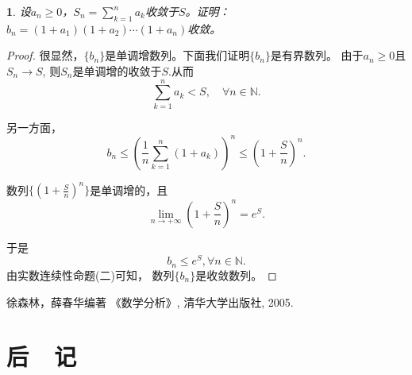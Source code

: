 \documentclass[utf8]{book}
\newtheorem{example}{}[section]             %
\begin{document}
\begin{example}
设$a_n\geq 0$，$S_n=\displaystyle\sum_{k=1}^na_k$收敛于$S$。证明：$b_n=(1+a_1)(1+a_2)\cdots(1+a_n)$收敛。
\end{example}
\begin{proof}很显然，$\{b_n\}$是单调增数列。下面我们证明$\{b_n\}$是有界数列。
由于$a_n\geq 0$且$S_n\rightarrow S$, 则$S_n$是单调增的收敛于$S$.从而$$\displaystyle\sum_{k=1}^na_k < S,\quad\forall n\in \mathbb{N}.$$

另一方面，
$$b_n\leq \left(\frac{1}{n}\displaystyle\sum_{k=1}^n(1+a_k)\right)^n\leq \left(1+\frac{S}{n}\right)^n.$$

数列$\{\left(1+\frac{S}{n}\right)^n\}$是单调增的，且$$\displaystyle  \lim_{n\to +\infty}\left(1+\frac{S}{n}\right)^n=e^{S}.$$

于是
$$b_n \leq e^{S}, \forall n\in\mathbb{N}.$$
由实数连续性命题(二)可知， 数列$\{b_n\}$是收敛数列。
\end{proof}









\appendix


\renewcommand\indexname{索~~引}
\printindex
{}

\backmatter


\begin{thebibliography}{参考文献}
 徐森林，薛春华编著 《数学分析》, 清华大学出版社, 2005.
\end{thebibliography}

\chapter{后~~记}

\begin{flushright}

\end{flushright}
\end{document}
